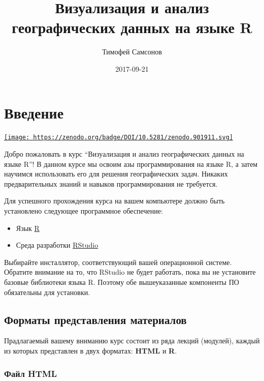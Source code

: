 \documentclass[]{book}
\title{Визуализация и анализ географических данных на языке R}
\author{Тимофей Самсонов}
\date{2017-09-21}
\providecommand{\tightlist}{%
  \setlength{\itemsep}{0pt}\setlength{\parskip}{0pt}}
\begin{document}
\maketitle

{
\setcounter{tocdepth}{1}
\tableofcontents
}
\chapter*{Введение}

\href{https://doi.org/10.5281/zenodo.901911}{\texttt{[image: https://zenodo.org/badge/DOI/10.5281/zenodo.901911.svg]}}

Добро пожаловать в курс ``Визуализация и анализ географических данных на
языке R''! В данном курсе мы освоим азы программирования на языке R, а
затем научимся использовать его для решения географических задач.
Никаких предварительных знаний и навыков программирования не требуется.

Для успешного прохождения курса на вашем компьютере должно быть
установлено следующее программное обеспечение:

\begin{itemize}
\tightlist
\item
  Язык \href{https://cran.gis-lab.info}{R}
\item
  Среда разработки
  \href{https://www.rstudio.com/products/rstudio/download3/}{RStudio}
\end{itemize}

Выбирайте инсталлятор, соответствующий вашей операционной системе.
Обратите внимание на то, что RStudio не будет работать, пока вы не
установите базовые библиотеки языка R. Поэтому обе вышеуказанные
компоненты ПО обязательны для установки.

\section*{Форматы представления материалов}\label{--}

Прадлагаемый вашему вниманию курс состоит из ряда лекций (модулей),
каждый из которых представлен в двух форматах: \textbf{HTML} и
\textbf{R}.

\subsection*{Файл HTML}\label{-html}
\end{document}
